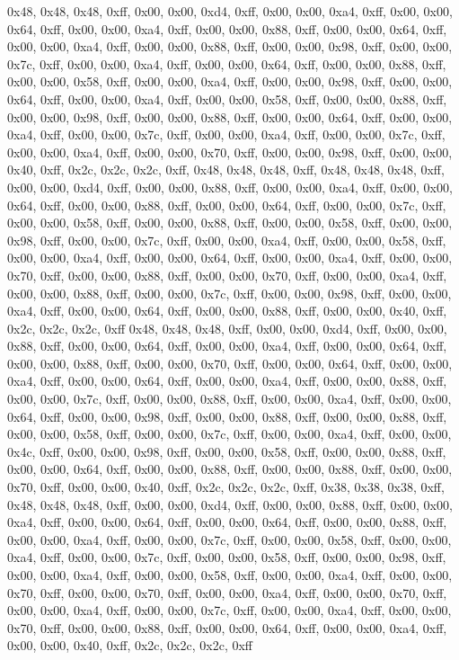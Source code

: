 0x48, 0x48, 0x48, 0xff, 0x00, 0x00, 0xd4, 0xff, 0x00, 0x00, 0xa4, 0xff, 0x00, 0x00, 0x64, 0xff, 0x00, 0x00, 0xa4, 0xff, 0x00, 0x00, 0x88, 0xff, 0x00, 0x00, 0x64, 0xff, 0x00, 0x00, 0xa4, 0xff, 0x00, 0x00, 0x88, 0xff, 0x00, 0x00, 0x98, 0xff, 0x00, 0x00, 0x7c, 0xff, 0x00, 0x00, 0xa4, 0xff, 0x00, 0x00, 0x64, 0xff, 0x00, 0x00, 0x88, 0xff, 0x00, 0x00, 0x58, 0xff, 0x00, 0x00, 0xa4, 0xff, 0x00, 0x00, 0x98, 0xff, 0x00, 0x00, 0x64, 0xff, 0x00, 0x00, 0xa4, 0xff, 0x00, 0x00, 0x58, 0xff, 0x00, 0x00, 0x88, 0xff, 0x00, 0x00, 0x98, 0xff, 0x00, 0x00, 0x88, 0xff, 0x00, 0x00, 0x64, 0xff, 0x00, 0x00, 0xa4, 0xff, 0x00, 0x00, 0x7c, 0xff, 0x00, 0x00, 0xa4, 0xff, 0x00, 0x00, 0x7c, 0xff, 0x00, 0x00, 0xa4, 0xff, 0x00, 0x00, 0x70, 0xff, 0x00, 0x00, 0x98, 0xff, 0x00, 0x00, 0x40, 0xff, 0x2c, 0x2c, 0x2c, 0xff, 0x48, 0x48, 0x48, 0xff, 0x48, 0x48, 0x48, 0xff, 0x00, 0x00, 0xd4, 0xff, 0x00, 0x00, 0x88, 0xff, 0x00, 0x00, 0xa4, 0xff, 0x00, 0x00, 0x64, 0xff, 0x00, 0x00, 0x88, 0xff, 0x00, 0x00, 0x64, 0xff, 0x00, 0x00, 0x7c, 0xff, 0x00, 0x00, 0x58, 0xff, 0x00, 0x00, 0x88, 0xff, 0x00, 0x00, 0x58, 0xff, 0x00, 0x00, 0x98, 0xff, 0x00, 0x00, 0x7c, 0xff, 0x00, 0x00, 0xa4, 0xff, 0x00, 0x00, 0x58, 0xff, 0x00, 0x00, 0xa4, 0xff, 0x00, 0x00, 0x64, 0xff, 0x00, 0x00, 0xa4, 0xff, 0x00, 0x00, 0x70, 0xff, 0x00, 0x00, 0x88, 0xff, 0x00, 0x00, 0x70, 0xff, 0x00, 0x00, 0xa4, 0xff, 0x00, 0x00, 0x88, 0xff, 0x00, 0x00, 0x7c, 0xff, 0x00, 0x00, 0x98, 0xff, 0x00, 0x00, 0xa4, 0xff, 0x00, 0x00, 0x64, 0xff, 0x00, 0x00, 0x88, 0xff, 0x00, 0x00, 0x40, 0xff, 0x2c, 0x2c, 0x2c, 0xff
0x48, 0x48, 0x48, 0xff, 0x00, 0x00, 0xd4, 0xff, 0x00, 0x00, 0x88, 0xff, 0x00, 0x00, 0x64, 0xff, 0x00, 0x00, 0xa4, 0xff, 0x00, 0x00, 0x64, 0xff, 0x00, 0x00, 0x88, 0xff, 0x00, 0x00, 0x70, 0xff, 0x00, 0x00, 0x64, 0xff, 0x00, 0x00, 0xa4, 0xff, 0x00, 0x00, 0x64, 0xff, 0x00, 0x00, 0xa4, 0xff, 0x00, 0x00, 0x88, 0xff, 0x00, 0x00, 0x7c, 0xff, 0x00, 0x00, 0x88, 0xff, 0x00, 0x00, 0xa4, 0xff, 0x00, 0x00, 0x64, 0xff, 0x00, 0x00, 0x98, 0xff, 0x00, 0x00, 0x88, 0xff, 0x00, 0x00, 0x88, 0xff, 0x00, 0x00, 0x58, 0xff, 0x00, 0x00, 0x7c, 0xff, 0x00, 0x00, 0xa4, 0xff, 0x00, 0x00, 0x4c, 0xff, 0x00, 0x00, 0x98, 0xff, 0x00, 0x00, 0x58, 0xff, 0x00, 0x00, 0x88, 0xff, 0x00, 0x00, 0x64, 0xff, 0x00, 0x00, 0x88, 0xff, 0x00, 0x00, 0x88, 0xff, 0x00, 0x00, 0x70, 0xff, 0x00, 0x00, 0x40, 0xff, 0x2c, 0x2c, 0x2c, 0xff, 0x38, 0x38, 0x38, 0xff, 0x48, 0x48, 0x48, 0xff, 0x00, 0x00, 0xd4, 0xff, 0x00, 0x00, 0x88, 0xff, 0x00, 0x00, 0xa4, 0xff, 0x00, 0x00, 0x64, 0xff, 0x00, 0x00, 0x64, 0xff, 0x00, 0x00, 0x88, 0xff, 0x00, 0x00, 0xa4, 0xff, 0x00, 0x00, 0x7c, 0xff, 0x00, 0x00, 0x58, 0xff, 0x00, 0x00, 0xa4, 0xff, 0x00, 0x00, 0x7c, 0xff, 0x00, 0x00, 0x58, 0xff, 0x00, 0x00, 0x98, 0xff, 0x00, 0x00, 0xa4, 0xff, 0x00, 0x00, 0x58, 0xff, 0x00, 0x00, 0xa4, 0xff, 0x00, 0x00, 0x70, 0xff, 0x00, 0x00, 0x70, 0xff, 0x00, 0x00, 0xa4, 0xff, 0x00, 0x00, 0x70, 0xff, 0x00, 0x00, 0xa4, 0xff, 0x00, 0x00, 0x7c, 0xff, 0x00, 0x00, 0xa4, 0xff, 0x00, 0x00, 0x70, 0xff, 0x00, 0x00, 0x88, 0xff, 0x00, 0x00, 0x64, 0xff, 0x00, 0x00, 0xa4, 0xff, 0x00, 0x00, 0x40, 0xff, 0x2c, 0x2c, 0x2c, 0xff
